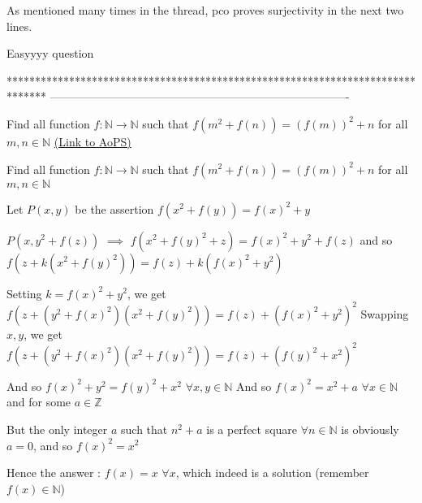 \begin{solution}
	As mentioned many times in the thread, pco proves surjectivity in the next two lines.
\end{solution}



\begin{solution}
	Easyyyy question
\end{solution}
*******************************************************************************
-------------------------------------------------------------------------------

\begin{problem}
	Find all function $f : \mathbb{N} \rightarrow \mathbb{N}$ such that $f(m^2 + f(n)) = (f(m))^2 + n$ for all $m , n \in \mathbb{N}$
	\flushright \href{https://artofproblemsolving.com/community/c6h485331}{(Link to AoPS)}
\end{problem}



\begin{solution}
	\begin{tcolorbox}Find all function $f : \mathbb{N} \rightarrow \mathbb{N}$ such that $f(m^2 + f(n)) = (f(m))^2 + n$ for all $m , n \in \mathbb{N}$\end{tcolorbox}
Let $P(x,y)$ be the assertion $f(x^2+f(y))=f(x)^2+y$

$P(x,y^2+f(z))$ $\implies$ $f(x^2+f(y)^2+z)=f(x)^2+y^2+f(z)$ and so $f(z+k(x^2+f(y)^2))=f(z)+k(f(x)^2+y^2)$

Setting $k=f(x)^2+y^2$, we get $f(z+(y^2+f(x)^2)(x^2+f(y)^2))=f(z)+(f(x)^2+y^2)^2$
Swapping $x,y$, we get $f(z+(y^2+f(x)^2)(x^2+f(y)^2))=f(z)+(f(y)^2+x^2)^2$

And so $f(x)^2+y^2=f(y)^2+x^2$ $\forall x,y\in\mathbb N$
And so $f(x)^2=x^2+a$ $\forall x\in\mathbb N$ and for some $a\in\mathbb Z$

But the only integer $a$ such that $n^2+a$ is a perfect square $\forall n\in\mathbb N$ is obviously $a=0$, and so $f(x)^2=x^2$

Hence the answer : $\boxed{f(x)=x}$ $\forall x$, which indeed is a solution (remember $f(x)\in\mathbb N$)
\end{solution}



